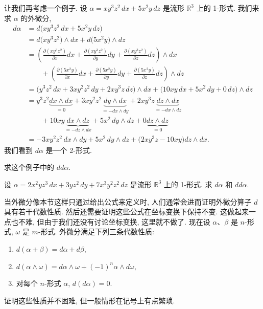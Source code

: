 让我们再考虑一个例子. 设 $\alpha=xy^3z^2\,dx+5x^2y\,dz$ 是流形 $\mathbb{R}^3$ 上的 1-形式. 我们来求 $\alpha$ 的外微分, 
\begin{align*}
d\alpha&=d\bigl(xy^3z^2\,dx+5x^2y\,dz\bigr)\\
&=d\bigl(xy^3z^2\bigr)\wedge dx+d\bigl(5x^2y\bigr)\wedge dz\\
&=\left(\frac{\partial(xy^3z^2)}{\partial x}dx+\frac{\partial(xy^3z^2)}{\partial y}dy+\frac{\partial(xy^3z^2)}{\partial z}dz\right)\wedge dx\\
&\qquad+\left(\frac{\partial(5x^2y)}{\partial x}dx+\frac{\partial(5x^2y)}{\partial y}dy+\frac{\partial(5x^2y)}{\partial z}dz\right)\wedge dz\\
&=\bigl(y^3z^2\,dx+3xy^2z^2\,dy+2xy^3z\,dz\bigr)\wedge dx
+\bigl(10xy\,dx+5x^2\,dy+0\,dz\bigr)\wedge dz\\
&=y^3z^2\underbrace{dx\wedge dx}_{=0}+3xy^2z^2\underbrace{dy\wedge dx}_{=-dx\wedge dy}+2xy^3z\underbrace{dz\wedge dx}_{=-dx\wedge dz}\\
&\qquad+10xy\underbrace{dx\wedge dz}_{=-dz\wedge dx}+5x^2\,dy\wedge dz+0\underbrace{dz\wedge dz}_{=0}\\
&=-3xy^2z^2\,dx\wedge dy+5x^2\,dy\wedge dz+\bigl(2xy^3z-10xy\bigr)dz\wedge dx.
\end{align*}
我们看到 $d\alpha$ 是一个 2-形式.

\begin{question}\label{q:4-1}
求这个例子中的 $dd\alpha$.
\end{question}

\begin{question}\label{q:4-2}
设 $\alpha=2x^2yz^3\,dx+3yz^2\,dy+7x^3y^2z^2\,dz$ 是流形 $\mathbb{R}^3$ 上的 1-形式. 求 $d\alpha$ 和 $dd\alpha$.
\end{question}

当外微分像本节这样只通过给出公式来定义时, 人们通常会进而证明外微分算子 $d$ 具有若干代数性质. 然后还需要证明这些公式在坐标变换下保持不变. 这做起来一点也不难, 但由于我们还没有讨论坐标变换, 这里就不做了. 现在设 $\alpha$、$\beta$ 是 $n$-形式, $\omega$ 是 $m$-形式. 外微分满足下列三条代数性质: 
\begin{enumerate}
  \item $d(\alpha+\beta)=d\alpha+d\beta$, 
  \item $d(\alpha\wedge\omega)=d\alpha\wedge\omega+(-1)^n\alpha\wedge d\omega$, 
  \item 对每个 $n$-形式 $\alpha$, $d(d\alpha)=0$.
\end{enumerate}
证明这些性质并不困难, 但一般情形在记号上有点繁琐.

